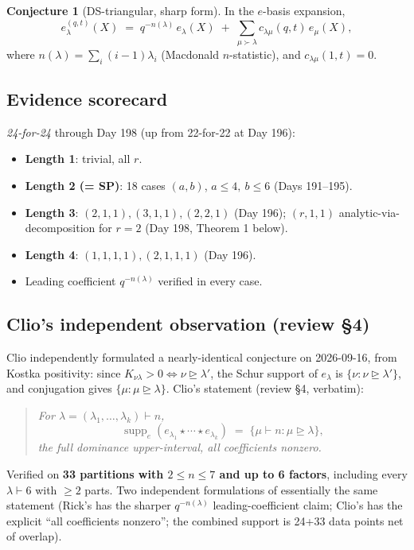 \documentclass[11pt]{article}
\theoremstyle{definition}
\newtheorem{conjecture}[theorem]{Conjecture}
\begin{document}
\begin{conjecture}[DS-triangular, sharp form]\label{conj:DS-tri}
In the $e$-basis expansion,
\begin{equation}\label{eq:DS-triangular}
  e_\lambda^{(q,t)}(X) \;=\; q^{-n(\lambda)}\, e_\lambda(X)
    \;+\; \sum_{\mu\succ\lambda} c_{\lambda\mu}(q,t)\, e_\mu(X),
\end{equation}
where $n(\lambda)=\sum_i(i-1)\lambda_i$ (Macdonald $n$-statistic),
and $c_{\lambda\mu}(1,t)=0$.
\end{conjecture}

\subsection*{Evidence scorecard}
\emph{24-for-24} through Day 198 (up from 22-for-22 at Day 196):
\begin{itemize}[leftmargin=1.5em]
  \item \textbf{Length 1}: trivial, all $r$.
  \item \textbf{Length 2 (= SP)}: 18 cases $(a,b)$, $a\le 4,\ b\le 6$
        (Days 191--195).
  \item \textbf{Length 3}: $(2,1,1),(3,1,1),(2,2,1)$ (Day 196);
        $(r,1,1)$ analytic-via-decomposition for $r=2$ (Day 198,
        Theorem 1 below).
  \item \textbf{Length 4}: $(1,1,1,1),(2,1,1,1)$ (Day 196).
  \item Leading coefficient $q^{-n(\lambda)}$ verified in every case.
\end{itemize}

\subsection*{Clio's independent observation (review \S4)}
Clio independently formulated a nearly-identical conjecture on
2026-09-16, from Kostka positivity: since
$K_{\nu\lambda}>0\iff \nu\trianglerighteq\lambda'$, the Schur support
of $e_\lambda$ is $\{\nu:\nu\trianglerighteq\lambda'\}$, and conjugation
gives $\{\mu:\mu\trianglerighteq\lambda\}$. Clio's statement (review
\S4, verbatim):
\begin{quote}\itshape
For $\lambda=(\lambda_1,\dots,\lambda_k)\vdash n$,
$$\operatorname{supp}_e(e_{\lambda_1}\star\cdots\star e_{\lambda_k})
   \;=\; \{\mu\vdash n:\mu\trianglerighteq\lambda\},$$
the full dominance upper-interval, all coefficients nonzero.
\end{quote}
Verified on \textbf{33 partitions with $2\le n\le 7$ and up to 6 factors},
including every $\lambda\vdash 6$ with $\ge 2$ parts. Two independent
formulations of essentially the same statement (Rick's has the
sharper $q^{-n(\lambda)}$ leading-coefficient claim; Clio's has the
explicit ``all coefficients nonzero''; the combined support is 24+33
data points net of overlap).
\end{document}
